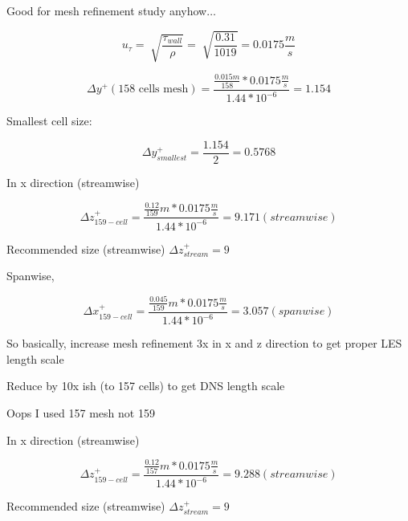 \documentclass[12pt]{article}
\renewcommand{\_}{\kern-1.5pt\textunderscore\kern-1.5pt}
\begin{document}
Good for mesh refinement study anyhow$ \ldots $ \par

 \[ u_{ \tau}=\sqrt[]{\frac{ \tau_{wall}}{ \rho }}=\sqrt[]{\frac{0.31}{1019}}=0.0175\frac{m}{s} \] \par

 \[  \Delta y^{+} \left( \text{158 cells mesh} \right) =\frac{\frac{0.015m}{158}\ast0.0175\frac{m}{s}}{1.44\ast10^{-6}}=1.154 \] \par

Smallest cell size:\par

 \[  \Delta y_{smallest}^{+}=\frac{1.154}{2}=0.5768 \] \par

In x direction (streamwise)\par


\vspace{\baselineskip}
 \[  \Delta z_{159-cell}^{+}=\frac{\frac{0.12}{159}m\ast0.0175\frac{m}{s}}{1.44\ast10^{-6}}=9.171  \left( streamwise \right)  \] \par

Recommended size (streamwise)  \(  \Delta z_{stream}^{+}=9 \) \par

Spanwise,\par

 \[  \Delta x_{159-cell}^{+}=\frac{\frac{0.045}{159}m\ast0.0175\frac{m}{s}}{1.44\ast10^{-6}}=3.057  \left( spanwise \right)  \] \par


\vspace{\baselineskip}
So basically, increase mesh refinement 3x in x and z direction to get proper LES length scale\par

Reduce by 10x ish (to 157 cells) to get DNS length scale\par

Oops I used 157 mesh not 159\par

In x direction (streamwise)\par


\vspace{\baselineskip}
 \[  \Delta z_{159-cell}^{+}=\frac{\frac{0.12}{157}m\ast0.0175\frac{m}{s}}{1.44\ast10^{-6}}=9.288  \left( streamwise \right)  \] \par

Recommended size (streamwise)  \(  \Delta z_{stream}^{+}=9 \) \par
\end{document}
